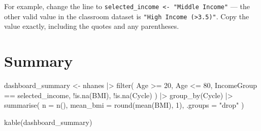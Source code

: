 \documentclass[
  letterpaper,
  DIV=11,
  numbers=noendperiod,
  oneside]{scrreprt}
\newenvironment{Shaded}{\begin{snugshade}}{\end{snugshade}}
\newcommand{\AttributeTok}[1]{\textcolor[rgb]{0.40,0.45,0.13}{#1}}
\newcommand{\CommentTok}[1]{\textcolor[rgb]{0.37,0.37,0.37}{#1}}
\newcommand{\ControlFlowTok}[1]{\textcolor[rgb]{0.00,0.23,0.31}{\textbf{#1}}}
\newcommand{\DecValTok}[1]{\textcolor[rgb]{0.68,0.00,0.00}{#1}}
\newcommand{\FunctionTok}[1]{\textcolor[rgb]{0.28,0.35,0.67}{#1}}
\newcommand{\NormalTok}[1]{\textcolor[rgb]{0.00,0.23,0.31}{#1}}
\newcommand{\OtherTok}[1]{\textcolor[rgb]{0.00,0.23,0.31}{#1}}
\newcommand{\SpecialCharTok}[1]{\textcolor[rgb]{0.37,0.37,0.37}{#1}}
\newcommand{\StringTok}[1]{\textcolor[rgb]{0.13,0.47,0.30}{#1}}
\begin{document}
\begin{Shaded}
\end{Shaded}

For example, change the line to
\texttt{selected\_income\ \textless{}-\ "Middle\ Income"} --- the other
valid value in the classroom dataset is
\texttt{"High\ Income\ (\textgreater{}3.5)"}. Copy the value exactly,
including the quotes and any parentheses.

\section*{Summary}\label{summary}


\begin{Shaded}
\begin{Highlighting}[numbers=left,,]
\NormalTok{dashboard\_summary }\OtherTok{\textless{}{-}}\NormalTok{ nhanes }\SpecialCharTok{|\textgreater{}}
  \FunctionTok{filter}\NormalTok{(}
\NormalTok{    Age }\SpecialCharTok{\textgreater{}=} \DecValTok{20}\NormalTok{,}
\NormalTok{    Age }\SpecialCharTok{\textless{}=} \DecValTok{80}\NormalTok{,}
\NormalTok{    IncomeGroup }\SpecialCharTok{==}\NormalTok{ selected\_income,}
    \SpecialCharTok{!}\FunctionTok{is.na}\NormalTok{(BMI),}
    \SpecialCharTok{!}\FunctionTok{is.na}\NormalTok{(Cycle)}
\NormalTok{  ) }\SpecialCharTok{|\textgreater{}}
  \FunctionTok{group\_by}\NormalTok{(Cycle) }\SpecialCharTok{|\textgreater{}}
  \FunctionTok{summarise}\NormalTok{(}
    \AttributeTok{n =} \FunctionTok{n}\NormalTok{(),}
    \AttributeTok{mean\_bmi =} \FunctionTok{round}\NormalTok{(}\FunctionTok{mean}\NormalTok{(BMI), }\DecValTok{1}\NormalTok{),}
    \AttributeTok{.groups =} \StringTok{"drop"}
\NormalTok{  )}

\FunctionTok{kable}\NormalTok{(dashboard\_summary)}
\end{Highlighting}
\end{Shaded}
\end{document}
